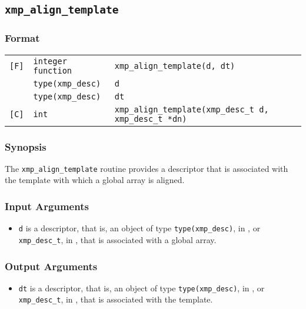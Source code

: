 \subsection{\tt xmp\_align\_template}

\subsubsection*{Format}

\begin{tabular}{lll}

\verb![F]!& {\tt integer function}& {\tt xmp\_align\_template(d, dt)}\\
          & {\tt type(xmp\_desc)} & {\tt d}\\
          & {\tt type(xmp\_desc)} & {\tt dt}\\

\verb![C]!&  {\tt int}& {\tt xmp\_align\_template(xmp\_desc\_t d, xmp\_desc\_t *dn)}\\

\end{tabular}

\subsubsection*{Synopsis}

The {\tt xmp\_align\_template} routine provides a descriptor that is
associated with the template with which a global array is aligned.


\subsubsection*{Input Arguments}
\begin{itemize}
 \item {\tt d} is a descriptor, that is, an object of type 
       {\tt type(xmp\_desc)}, in {\XMPF}, or {\tt xmp\_desc\_t},
       in {\XMPC}, that is associated with a global array.
\end{itemize}

\subsubsection*{Output Arguments}
\begin{itemize}
 \item {\tt dt} is a descriptor, that is, an object of type 
       {\tt type(xmp\_desc)}, in {\XMPF}, or {\tt xmp\_desc\_t},
       in {\XMPC}, that is associated with the template.
\end{itemize}



